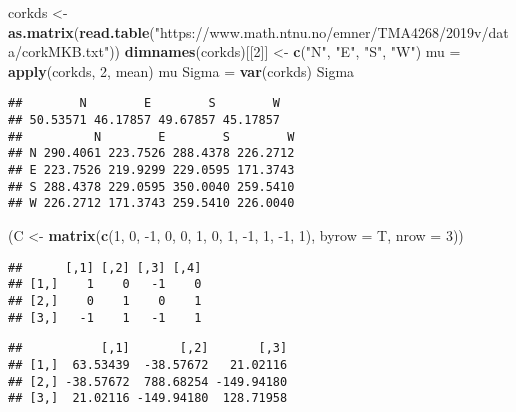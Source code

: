 \documentclass[ignorenonframetext,]{beamer}
\newenvironment{Shaded}{\begin{snugshade}}{\end{snugshade}}
\newcommand{\DataTypeTok}[1]{\textcolor[rgb]{0.13,0.29,0.53}{#1}}
\newcommand{\DecValTok}[1]{\textcolor[rgb]{0.00,0.00,0.81}{#1}}
\newcommand{\KeywordTok}[1]{\textcolor[rgb]{0.13,0.29,0.53}{\textbf{#1}}}
\newcommand{\NormalTok}[1]{#1}
\newcommand{\OperatorTok}[1]{\textcolor[rgb]{0.81,0.36,0.00}{\textbf{#1}}}
\newcommand{\StringTok}[1]{\textcolor[rgb]{0.31,0.60,0.02}{#1}}
\begin{document}
\begin{frame}[fragile]

\tiny

\begin{Shaded}
\begin{Highlighting}[]
\NormalTok{corkds <-}\StringTok{ }\KeywordTok{as.matrix}\NormalTok{(}\KeywordTok{read.table}\NormalTok{(}\StringTok{"https://www.math.ntnu.no/emner/TMA4268/2019v/data/corkMKB.txt"}\NormalTok{))}
\KeywordTok{dimnames}\NormalTok{(corkds)[[}\DecValTok{2}\NormalTok{]] <-}\StringTok{ }\KeywordTok{c}\NormalTok{(}\StringTok{"N"}\NormalTok{, }\StringTok{"E"}\NormalTok{, }\StringTok{"S"}\NormalTok{, }\StringTok{"W"}\NormalTok{)}
\NormalTok{mu =}\StringTok{ }\KeywordTok{apply}\NormalTok{(corkds, }\DecValTok{2}\NormalTok{, mean)}
\NormalTok{mu}
\NormalTok{Sigma =}\StringTok{ }\KeywordTok{var}\NormalTok{(corkds)}
\NormalTok{Sigma}
\end{Highlighting}
\end{Shaded}

\begin{verbatim}
##        N        E        S        W 
## 50.53571 46.17857 49.67857 45.17857 
##          N        E        S        W
## N 290.4061 223.7526 288.4378 226.2712
## E 223.7526 219.9299 229.0595 171.3743
## S 288.4378 229.0595 350.0040 259.5410
## W 226.2712 171.3743 259.5410 226.0040
\end{verbatim}

\begin{Shaded}
\begin{Highlighting}[]
\NormalTok{(C <-}\StringTok{ }\KeywordTok{matrix}\NormalTok{(}\KeywordTok{c}\NormalTok{(}\DecValTok{1}\NormalTok{, }\DecValTok{0}\NormalTok{, }\DecValTok{-1}\NormalTok{, }\DecValTok{0}\NormalTok{, }\DecValTok{0}\NormalTok{, }\DecValTok{1}\NormalTok{, }\DecValTok{0}\NormalTok{, }\DecValTok{1}\NormalTok{, }\DecValTok{-1}\NormalTok{, }\DecValTok{1}\NormalTok{, }\DecValTok{-1}\NormalTok{, }\DecValTok{1}\NormalTok{), }\DataTypeTok{byrow =}\NormalTok{ T, }\DataTypeTok{nrow =} \DecValTok{3}\NormalTok{))}
\end{Highlighting}
\end{Shaded}

\begin{verbatim}
##      [,1] [,2] [,3] [,4]
## [1,]    1    0   -1    0
## [2,]    0    1    0    1
## [3,]   -1    1   -1    1
\end{verbatim}

\begin{Shaded}
\end{Shaded}

\begin{verbatim}
##           [,1]       [,2]       [,3]
## [1,]  63.53439  -38.57672   21.02116
## [2,] -38.57672  788.68254 -149.94180
## [3,]  21.02116 -149.94180  128.71958
\end{verbatim}

\end{frame}
\end{document}
